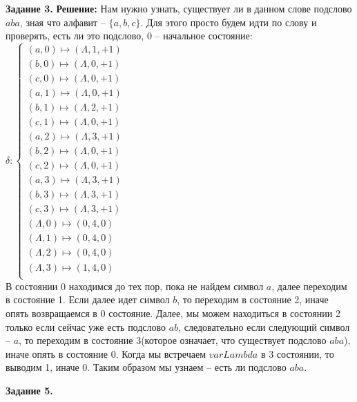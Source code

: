 \documentclass[12pt,a4paper]{scrartcl}
\begin{document}
	\noindent
	\textbf{Задание 3.} 
	\newline
	\textbf{Решение:}
	\newline
	\indent
	Нам нужно узнать, существует ли в данном слове подслово $aba$, зная что алфавит -- $\{a, b, c\}$. Для этого просто будем идти по слову и проверять, есть ли это подслово, 0 -- начальное состояние:\\
	$
	\delta: 
	\begin{cases}
	(a, 0) \longmapsto (\varLambda, 1, +1) \\
	(b, 0) \longmapsto (\varLambda, 0, +1) \\	
	(c, 0) \longmapsto (\varLambda, 0, +1) \\
	(a, 1) \longmapsto (\varLambda, 0, +1) \\
	(b, 1) \longmapsto (\varLambda, 2, +1) \\
	(c, 1) \longmapsto (\varLambda, 0, +1) \\
	(a, 2) \longmapsto (\varLambda, 3, +1) \\
	(b, 2) \longmapsto (\varLambda, 0, +1) \\
	(c, 2) \longmapsto (\varLambda, 0, +1) \\
	(a, 3) \longmapsto (\varLambda, 3, +1) \\
	(b, 3) \longmapsto (\varLambda, 3, +1) \\
	(c, 3) \longmapsto (\varLambda, 3, +1) \\
	(\varLambda, 0) \longmapsto (0, 4, 0) \\
	(\varLambda, 1) \longmapsto (0, 4, 0) \\
	(\varLambda, 2) \longmapsto (0, 4, 0) \\
	(\varLambda, 3) \longmapsto (1, 4, 0) \\
	\end{cases}
	$ \\
	В состоянии 0 находимся до тех пор, пока не найдем символ $a$, далее переходим в состояние 1. Если далее идет символ $b$, то переходим в состояние 2, иначе опять возвращаемся в 0 состояние. Далее, мы можем находиться в состоянии 2 только если сейчас уже есть подслово $ab$, следовательно если следующий символ -- $a$, то переходим в состояние 3(которое означает, что существует подслово $aba$), иначе опять в состояние 0. Когда мы встречаем $varLambda$ в 3 состоянии, то выводим 1, иначе 0. Таким образом мы узнаем -- есть ли подслово $aba$.
	\begin{flushright}	
		\textbf{}
	\end{flushright}
	\textbf{Задание 5.} 
	\newline
\end{document}
